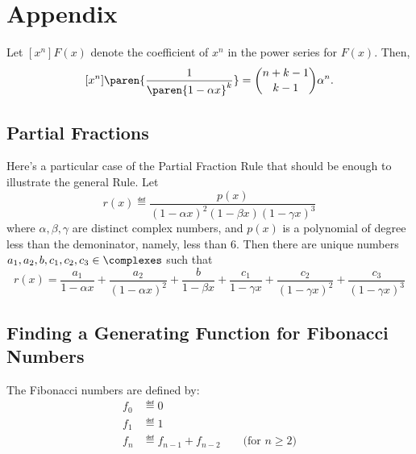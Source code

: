 \documentclass[handout]{mcs}
\begin{document}



\iffalse

\section*{Appendix}

Let $[x^n]F(x)$ denote the coefficient of $x^n$ in the power series
for $F(x)$.  Then,
\begin{equation}\label{1axk}
[x^n]\paren{\frac{1}{\paren{1-\alpha x}^k}} = \binom{n+k-1}{k-1}\alpha^n.
\end{equation}

\subsection*{Partial Fractions}

Here's a particular case of the Partial Fraction Rule that should be
enough to illustrate the general Rule.  Let
\[
r(x) \eqdef \frac{p(x)}{(1-\alpha x)^2 (1-\beta x) (1-\gamma x)^3}
\]
where $\alpha, \beta, \gamma$ are distinct complex numbers, and $p(x)$ is
a polynomial of degree less than the demoninator, namely, less than 6.
Then there are unique numbers $a_1,a_2,b,c_1,c_2,c_3 \in \complexes$ such
that
\[
r(x)
= \frac{a_1}{1-\alpha x} + \frac{a_2}{(1-\alpha x)^2}
+ \frac{b}{1-\beta x}
+ \frac{c_1}{1-\gamma x} + \frac{c_2}{(1-\gamma x)^2} + \frac{c_3}{(1-\gamma x)^3}
\]

\iffalse

Partial fractions together with~\eqref{1axk} imply that there is a closed
form expression for $[x^n]\paren{R(x)/S(x)}$ for arbitrary polynomials
$R(x),S(x)$.
\fi

\subsection*{Finding a Generating Function for Fibonacci Numbers}
The Fibonacci numbers are defined by:
\begin{align*}
f_0 & \eqdef 0 \\
f_1 & \eqdef 1 \\
f_n & \eqdef f_{n-1} + f_{n-2} \qquad \text{(for $n \geq 2$)}
\end{align*}
\end{document}
